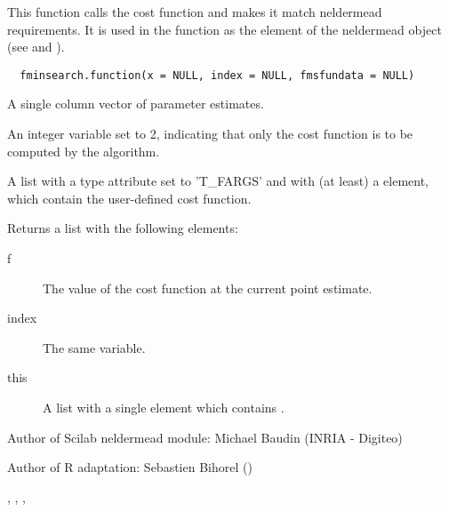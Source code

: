 %
\begin{Description}\relax
This function calls the cost function and makes it match neldermead
requirements. It is used in the  function as the
 element of the neldermead object (see 
and ). 
\end{Description}
%
\begin{Usage}
\begin{verbatim}
  fminsearch.function(x = NULL, index = NULL, fmsfundata = NULL)
\end{verbatim}
\end{Usage}
%
\begin{Arguments}
\begin{ldescription}
\item[\code{x}] A single column vector of parameter estimates.
\item[\code{index}] An integer variable set to 2, indicating that only the cost
function is to be computed by the algorithm.
\item[\code{fmsfundata}] A list with a type attribute set to 'T\_FARGS' and
with (at least) a  element, which contain the user-defined cost
function.
\end{ldescription}
\end{Arguments}
%
\begin{Value}
Returns a list with the following elements: \begin{description}

\item[f] The value of the cost function at the current point estimate.
\item[index] The same  variable.
\item[this] A list with a single element  which
contains .

\end{description}

\end{Value}
%
\begin{Author}\relax
Author of Scilab neldermead module: Michael Baudin (INRIA - Digiteo)

Author of R adaptation: Sebastien Bihorel ()
\end{Author}
%
\begin{SeeAlso}\relax
{},
,
,
\end{SeeAlso}
